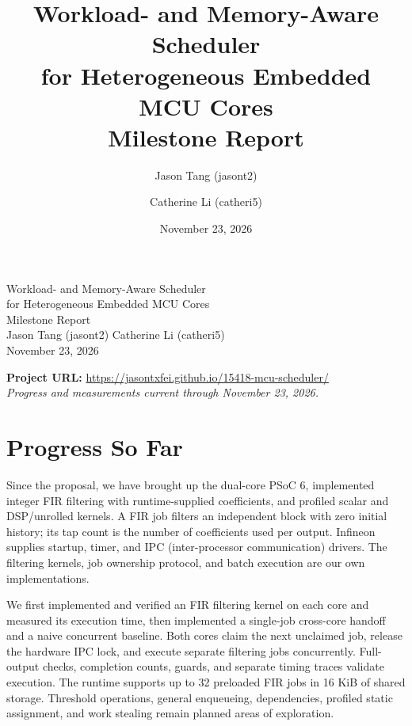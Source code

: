 \documentclass[10pt]{article}
\title{Workload- and Memory-Aware Scheduler\\
for Heterogeneous Embedded MCU Cores\\[0.4em]\large Milestone Report}
\author{Jason Tang (jasont2) \and Catherine Li (catheri5)}
\date{November 23, 2026}
\begin{document}
\begin{center}
{\Large Workload- and Memory-Aware Scheduler\\
for Heterogeneous Embedded MCU Cores}\\[0.3em]
{\large Milestone Report}\\[0.5em]
Jason Tang (jasont2) \quad Catherine Li (catheri5)\\
November 23, 2026
\end{center}
\textbf{Project URL:} \url{https://jasontxfei.github.io/15418-mcu-scheduler/}\\
\textit{Progress and measurements current through November 23, 2026.}

\section{Progress So Far}
Since the proposal, we have brought up the dual-core PSoC 6, implemented
integer FIR filtering with runtime-supplied coefficients, and profiled scalar
and DSP/unrolled kernels. A FIR job filters an independent block with zero
initial history; its tap count is the number of coefficients used per output.
Infineon supplies startup, timer, and IPC (inter-processor communication) drivers. The filtering kernels,
job ownership protocol, and batch execution are our own implementations.

We first implemented and verified an FIR filtering kernel on each core and measured its execution time, then implemented a single-job cross-core handoff and a naive concurrent baseline. Both cores claim the next unclaimed job, release the hardware IPC lock, and execute separate filtering jobs concurrently.
Full-output checks, completion counts, guards, and separate timing traces
validate execution. The runtime supports up to 32 preloaded FIR jobs in
16 KiB of shared storage. Threshold operations, general enqueueing,
dependencies, profiled static assignment, and work stealing remain planned areas of exploration.
\end{document}
